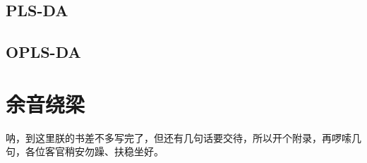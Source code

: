 \documentclass[]{ctexbook}
\begin{document}
\hypertarget{pls-da}{%
\section{PLS-DA}\label{pls-da}}

\hypertarget{opls-da}{%
\section{OPLS-DA}\label{opls-da}}

\cleardoublepage

\hypertarget{appendix-}{%
\appendix {}}


\hypertarget{sound}{%
\chapter{余音绕梁}\label{sound}}

呐，到这里朕的书差不多写完了，但还有几句话要交待，所以开个附录，再啰嗦几句，各位客官稍安勿躁、扶稳坐好。



\backmatter
\printindex
\end{document}
